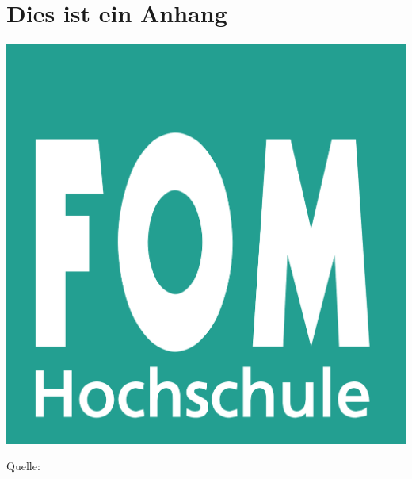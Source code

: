 
\renewcommand\thesection{Anhang \arabic{section}:} %

\begin{minipage}{\textwidth}
	\section{Dies ist ein Anhang}
	\label{anh:beispiel}
	\includegraphics[width=0.5\linewidth]{Abbildungen/fom_logo.png} 
	\par\smallskip
	Quelle: \cite{logo}
\end{minipage}

\renewcommand\thesection{\thechapter.\arabic{section}}
